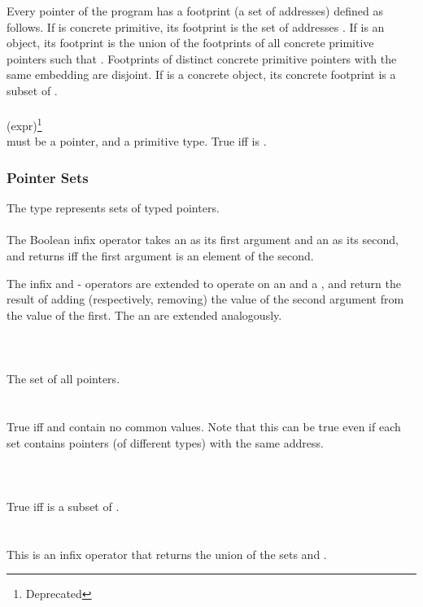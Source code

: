 \documentclass[preprint,nocopyrightspace]{sigplanconf}
\begin{document}
{{Every pointer of the program has a footprint (a set of addresses)
defined as follows.  If  is concrete primitive, its footprint
is the set of addresses
\vcc{[\addr(p),\addr(p) + \sizeof_object(p))}.
If  is an object, its footprint is the union of
the footprints of all concrete primitive pointers 
 such that . 
Footprints of distinct concrete primitive pointers with the same
embedding are disjoint.  If  is a concrete object, its concrete
footprint is a subset of 
\vcc{[\addr(p),\addr(p) + \sizeof_object(p))}.
\\\\
 (expr)\footnote{Deprecated}\\
 must be a pointer, and  a primitive type. 
True iff  is .

\subsubsection{Pointer Sets}
The type \vcc{\objset} represents sets of typed pointers.
\\\\
The Boolean infix operator \vcc{\in} takes an
\vcc{\object} as its first argument and an \vcc{\objset} as its second,
and returns \vcc{\true} iff the first argument is an
element of the second.

The infix \vcc{+} and {-} operators are extended to operate on
an \vcc{\objset} and a \vcc{\object}, and return the result of adding
(respectively, removing) the value of the second argument from the
value of the first. The \vcc{+=} an \vcc{-=} are extended analogously.
\\\\
\vcc{\objset \everything()}\\
\vcc{\objset \universe()}\\
The set of all pointers.
\\\\
\\
True iff  and  contain no common values. Note that
this can be true even if each set contains pointers (of different
types) with the same address.\\
\\\\
\\
True iff  is a subset of .
\\\\
\\
This is an infix operator that returns the union of the sets 
and .

}}
\end{document}
